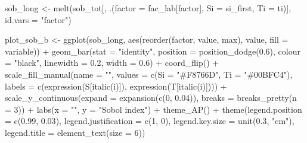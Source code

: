 \documentclass[
  11pt,
]{article}
\newenvironment{Shaded}{\begin{snugshade}}{\end{snugshade}}
\newcommand{\AttributeTok}[1]{\textcolor[rgb]{0.77,0.63,0.00}{#1}}
\newcommand{\DecValTok}[1]{\textcolor[rgb]{0.00,0.00,0.81}{#1}}
\newcommand{\FloatTok}[1]{\textcolor[rgb]{0.00,0.00,0.81}{#1}}
\newcommand{\FunctionTok}[1]{\textcolor[rgb]{0.00,0.00,0.00}{#1}}
\newcommand{\NormalTok}[1]{#1}
\newcommand{\OtherTok}[1]{\textcolor[rgb]{0.56,0.35,0.01}{#1}}
\newcommand{\SpecialCharTok}[1]{\textcolor[rgb]{0.00,0.00,0.00}{#1}}
\newcommand{\StringTok}[1]{\textcolor[rgb]{0.31,0.60,0.02}{#1}}
\begin{document}
\begin{Shaded}
\begin{Highlighting}[]
\NormalTok{sob\_long }\OtherTok{\textless{}{-}} \FunctionTok{melt}\NormalTok{(sob\_tot[, .(}\AttributeTok{factor =}\NormalTok{ fac\_lab[factor], }\AttributeTok{Si =}\NormalTok{ si\_first, }\AttributeTok{Ti =}\NormalTok{ ti)],}
                 \AttributeTok{id.vars =} \StringTok{"factor"}\NormalTok{)}

\NormalTok{plot\_sob\_b }\OtherTok{\textless{}{-}} \FunctionTok{ggplot}\NormalTok{(sob\_long, }\FunctionTok{aes}\NormalTok{(}\FunctionTok{reorder}\NormalTok{(factor, value, max), value,}
                                   \AttributeTok{fill =}\NormalTok{ variable)) }\SpecialCharTok{+}
  \FunctionTok{geom\_bar}\NormalTok{(}\AttributeTok{stat =} \StringTok{"identity"}\NormalTok{, }\AttributeTok{position =} \FunctionTok{position\_dodge}\NormalTok{(}\FloatTok{0.6}\NormalTok{),}
           \AttributeTok{colour =} \StringTok{"black"}\NormalTok{, }\AttributeTok{linewidth =} \FloatTok{0.2}\NormalTok{, }\AttributeTok{width =} \FloatTok{0.6}\NormalTok{) }\SpecialCharTok{+}
  \FunctionTok{coord\_flip}\NormalTok{() }\SpecialCharTok{+}
  \FunctionTok{scale\_fill\_manual}\NormalTok{(}\AttributeTok{name =} \StringTok{""}\NormalTok{,}
                    \AttributeTok{values =} \FunctionTok{c}\NormalTok{(}\AttributeTok{Si =} \StringTok{"\#F8766D"}\NormalTok{, }\AttributeTok{Ti =} \StringTok{"\#00BFC4"}\NormalTok{),}
                    \AttributeTok{labels =} \FunctionTok{c}\NormalTok{(}\FunctionTok{expression}\NormalTok{(S[}\FunctionTok{italic}\NormalTok{(i)]),}
                               \FunctionTok{expression}\NormalTok{(T[}\FunctionTok{italic}\NormalTok{(i)]))) }\SpecialCharTok{+}
  \FunctionTok{scale\_y\_continuous}\NormalTok{(}\AttributeTok{expand =} \FunctionTok{expansion}\NormalTok{(}\FunctionTok{c}\NormalTok{(}\DecValTok{0}\NormalTok{, }\FloatTok{0.04}\NormalTok{)),}
                     \AttributeTok{breaks =} \FunctionTok{breaks\_pretty}\NormalTok{(}\AttributeTok{n =} \DecValTok{3}\NormalTok{)) }\SpecialCharTok{+}
  \FunctionTok{labs}\NormalTok{(}\AttributeTok{x =} \StringTok{""}\NormalTok{, }\AttributeTok{y =} \StringTok{"Sobol\textquotesingle{} index"}\NormalTok{) }\SpecialCharTok{+}
  \FunctionTok{theme\_AP}\NormalTok{() }\SpecialCharTok{+}
  \FunctionTok{theme}\NormalTok{(}\AttributeTok{legend.position =} \FunctionTok{c}\NormalTok{(}\FloatTok{0.99}\NormalTok{, }\FloatTok{0.03}\NormalTok{), }\AttributeTok{legend.justification =} \FunctionTok{c}\NormalTok{(}\DecValTok{1}\NormalTok{, }\DecValTok{0}\NormalTok{),}
        \AttributeTok{legend.key.size =} \FunctionTok{unit}\NormalTok{(}\FloatTok{0.3}\NormalTok{, }\StringTok{"cm"}\NormalTok{), }\AttributeTok{legend.title =} \FunctionTok{element\_text}\NormalTok{(}\AttributeTok{size =} \DecValTok{6}\NormalTok{))}


\end{Highlighting}
\end{Shaded}
\end{document}
